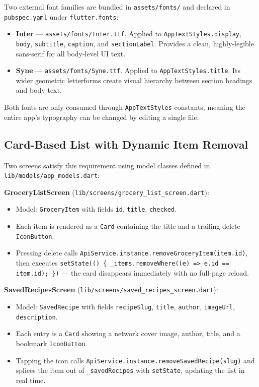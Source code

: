 \documentclass[11pt,a4paper]{article}
\begin{document}
Two external font families are bundled in \texttt{assets/fonts/} and declared in \texttt{pubspec.yaml} under \texttt{flutter.fonts}:

\begin{itemize}
  \item \textbf{Inter} — \texttt{assets/fonts/Inter.ttf}. Applied to \texttt{AppTextStyles.display}, \texttt{body}, \texttt{subtitle}, \texttt{caption}, and \texttt{sectionLabel}. Provides a clean, highly-legible sans-serif for all body-level UI text.
  \item \textbf{Syne} — \texttt{assets/fonts/Syne.ttf}. Applied to \texttt{AppTextStyles.title}. Its wider geometric letterforms create visual hierarchy between section headings and body text.
\end{itemize}

Both fonts are only consumed through \texttt{AppTextStyles} constants, meaning the entire app's typography can be changed by editing a single file.

\subsection{Card-Based List with Dynamic Item Removal}

Two screens satisfy this requirement using model classes defined in \texttt{lib/models/app\_models.dart}:

\textbf{GroceryListScreen} (\texttt{lib/screens/grocery\_list\_screen.dart}):
\begin{itemize}
  \item Model: \texttt{GroceryItem} with fields \texttt{id}, \texttt{title}, \texttt{checked}.
  \item Each item is rendered as a \texttt{Card} containing the title and a trailing delete \texttt{IconButton}.
  \item Pressing delete calls \texttt{ApiService.instance.removeGroceryItem(item.id)}, then executes \texttt{setState(() \{ \_items.removeWhere((e) => e.id == item.id); \})} — the card disappears immediately with no full-page reload.
\end{itemize}

\textbf{SavedRecipesScreen} (\texttt{lib/screens/saved\_recipes\_screen.dart}):
\begin{itemize}
  \item Model: \texttt{SavedRecipe} with fields \texttt{recipeSlug}, \texttt{title}, \texttt{author}, \texttt{imageUrl}, \texttt{description}.
  \item Each entry is a \texttt{Card} showing a network cover image, author, title, and a bookmark \texttt{IconButton}.
  \item Tapping the icon calls \texttt{ApiService.instance.removeSavedRecipe(slug)} and splices the item out of \texttt{\_savedRecipes} with \texttt{setState}, updating the list in real time.
\end{itemize}
\end{document}
